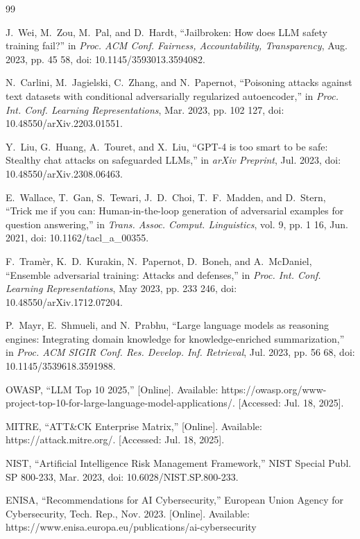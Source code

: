 \documentclass[12pt,twocolumn,journal]{IEEEtran}
\begin{document}
\begin{thebibliography}{99}

J.~Wei, M.~Zou, M.~Pal, and D.~Hardt, ``Jailbroken: How does LLM safety training fail?'' in \emph{Proc. ACM Conf. Fairness, Accountability, Transparency}, Aug. 2023, pp. 45 58, doi: 10.1145/3593013.3594082.

N.~Carlini, M.~Jagielski, C.~Zhang, and N.~Papernot, ``Poisoning attacks against text datasets with conditional adversarially regularized autoencoder,'' in \emph{Proc. Int. Conf. Learning Representations}, Mar. 2023, pp. 102 127, doi: 10.48550/arXiv.2203.01551.

Y.~Liu, G.~Huang, A.~Touret, and X.~Liu, ``GPT-4 is too smart to be safe: Stealthy chat attacks on safeguarded LLMs,'' in \emph{arXiv Preprint}, Jul. 2023, doi: 10.48550/arXiv.2308.06463.

E.~Wallace, T.~Gan, S.~Tewari, J.~D.~Choi, T.~F.~Madden, and D.~Stern, ``Trick me if you can: Human-in-the-loop generation of adversarial examples for question answering,'' in \emph{Trans. Assoc. Comput. Linguistics}, vol. 9, pp. 1 16, Jun. 2021, doi: 10.1162/tacl\_a\_00355.

F.~Tramèr, K.~D.~Kurakin, N.~Papernot, D.~Boneh, and A.~McDaniel, ``Ensemble adversarial training: Attacks and defenses,'' in \emph{Proc. Int. Conf. Learning Representations}, May 2023, pp. 233 246, doi: 10.48550/arXiv.1712.07204.

P.~Mayr, E.~Shmueli, and N.~Prabhu, ``Large language models as reasoning engines: Integrating domain knowledge for knowledge-enriched summarization,'' in \emph{Proc. ACM SIGIR Conf. Res. Develop. Inf. Retrieval}, Jul. 2023, pp. 56 68, doi: 10.1145/3539618.3591988.

OWASP, ``LLM Top 10 2025,'' [Online]. Available: https://owasp.org/www-project-top-10-for-large-language-model-applications/. [Accessed: Jul. 18, 2025].

MITRE, ``ATT\&CK Enterprise Matrix,'' [Online]. Available: https://attack.mitre.org/. [Accessed: Jul. 18, 2025].

NIST, ``Artificial Intelligence Risk Management Framework,'' NIST Special Publ. SP 800-233, Mar. 2023, doi: 10.6028/NIST.SP.800-233.

ENISA, ``Recommendations for AI Cybersecurity,'' European Union Agency for Cybersecurity, Tech. Rep., Nov. 2023. [Online]. Available: https://www.enisa.europa.eu/publications/ai-cybersecurity


\end{thebibliography}
\end{document}
